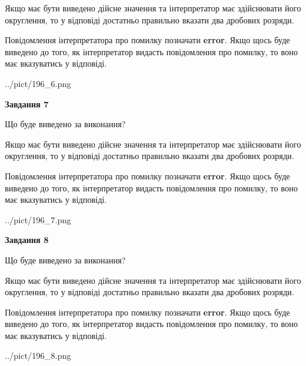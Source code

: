 \documentclass[12pt, ukrainian]{article}
\begin{document}
{\begin {Large}
Якщо має бути виведено дійсне значення та інтерпретатор має здійснювати його округлення, 
то у відповіді достатньо правильно вказати два дробових розряди.

Повідомлення інтерпретатора про помилку позначати \textbf{error}.
Якщо щось буде виведено до того, як інтерпретатор видасть повідомлення про помилку, 
то воно має вказуватись у відповіді. \par

\begin{center}
	{../pict/196_6.png}
\end{center}
\newpage

{\begin {center}\textbf{Завдання 7}\end {center}}\par
Що буде виведено за виконання? \par

Якщо має бути виведено дійсне значення та інтерпретатор має здійснювати його округлення, 
то у відповіді достатньо правильно вказати два дробових розряди.

Повідомлення інтерпретатора про помилку позначати \textbf{error}.
Якщо щось буде виведено до того, як інтерпретатор видасть повідомлення про помилку, 
то воно має вказуватись у відповіді. \par

\begin{center}
	{../pict/196_7.png}
\end{center}
\newpage

{\begin {center}\textbf{Завдання 8}\end {center}}\par
Що буде виведено за виконання? \par

Якщо має бути виведено дійсне значення та інтерпретатор має здійснювати його округлення, 
то у відповіді достатньо правильно вказати два дробових розряди.

Повідомлення інтерпретатора про помилку позначати \textbf{error}.
Якщо щось буде виведено до того, як інтерпретатор видасть повідомлення про помилку, 
то воно має вказуватись у відповіді. \par

\begin{center}
	{../pict/196_8.png}
\end{center}
\newpage


\end{Large}}
\end{document}
